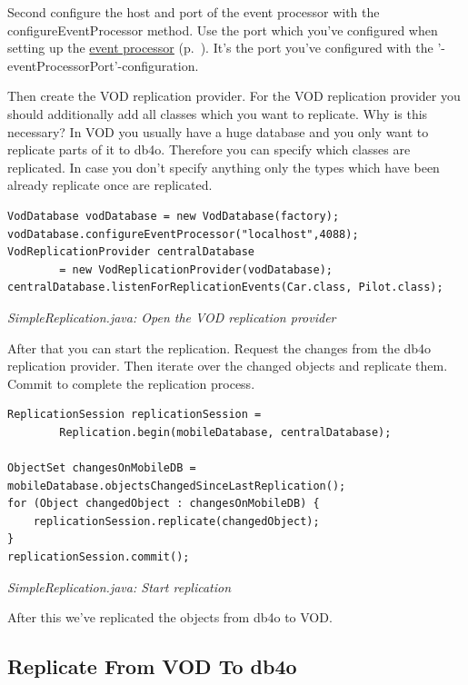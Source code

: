 Second configure the host and port of the event processor with the configureEventProcessor method. Use the port which you've configured when setting up the \hyperref[drs:db4o-replication-system-drs-vod-setup-event-processing]{event processor} (p.~\pageref{drs:db4o-replication-system-drs-vod-setup-event-processing}). It's the port you've configured with the '-eventProcessorPort'-configuration.

Then create the VOD replication provider. For the VOD replication provider you should additionally add all classes which you want to replicate. Why is this necessary? In VOD you usually have a huge database and you only want to replicate parts of it to db4o. Therefore you can specify which classes are replicated. In case you don't specify anything only the types which have been already replicate once are replicated.

\begin{lstlisting}
VodDatabase vodDatabase = new VodDatabase(factory);
vodDatabase.configureEventProcessor("localhost",4088);
VodReplicationProvider centralDatabase
        = new VodReplicationProvider(vodDatabase);
centralDatabase.listenForReplicationEvents(Car.class, Pilot.class);
\end{lstlisting}

{\small\itshape SimpleReplication.java: Open the VOD replication provider\par}
\medskip

After that you can start the replication. Request the changes from the db4o replication provider. Then iterate over the changed objects and replicate them. Commit to complete the replication process.

\begin{lstlisting}
ReplicationSession replicationSession =
        Replication.begin(mobileDatabase, centralDatabase);

ObjectSet changesOnMobileDB = mobileDatabase.objectsChangedSinceLastReplication();
for (Object changedObject : changesOnMobileDB) {
    replicationSession.replicate(changedObject);
}
replicationSession.commit();
\end{lstlisting}

{\small\itshape SimpleReplication.java: Start replication\par}
\medskip

After this we've replicated the objects from db4o to VOD.

\subsection{Replicate From VOD To db4o}
\label{drs:db4o-replication-system-drs-vod-vod-replication:vodtodb4o}

